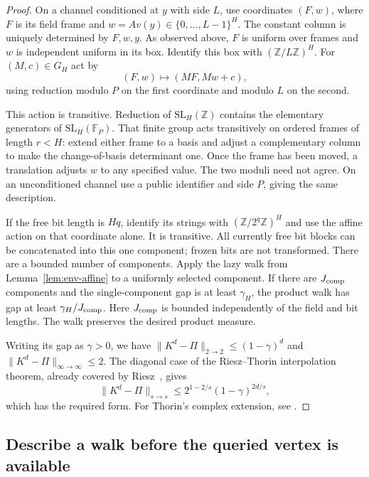 \begin{proof}
On a channel conditioned at $y$ with side $L$, use coordinates
$(F,w)$, where $F$ is its field frame and
$w=Av(y)\in\{0,\ldots,L-1\}^H$. The constant column is uniquely
determined by $F,w,y$. As observed above, $F$ is uniform over frames
and $w$ is independent uniform in its box. Identify this box with
$(\mathbb Z/L\mathbb Z)^H$.
For $(M,c)\in G_H$ act by
\[
(F,w)\longmapsto(MF,Mw+c),
\]
using reduction modulo $P$ on the first coordinate and modulo $L$
on the second.

This action is transitive. Reduction of $\mathrm{SL}_H(\mathbb Z)$
contains the elementary generators of $\mathrm{SL}_H(\mathbb F_P)$.
That finite group acts transitively on ordered frames of length
$r<H$: extend either frame to a basis and adjust a complementary
column to make the change-of-basis determinant one. Once the frame
has been moved, a translation adjusts $w$ to any specified value.
The two moduli need not agree. On an unconditioned channel use a
public identifier and side $P$, giving the same description.

If the free bit length is $Hq$, identify its strings with
$(\mathbb Z/2^q\mathbb Z)^H$ and use the affine action on that
coordinate alone. It is transitive. All currently free bit blocks
can be concatenated into this one component; frozen bits are not
transformed.
There are a bounded number of components. Apply the lazy walk from
Lemma~\ref{lem:env-affine} to a uniformly selected component.
If there are $J_{\rm comp}$ components and the single-component gap is
at least $\gamma_H$, the product walk has gap at least
$\gamma_H/J_{\rm comp}$. Here $J_{\rm comp}$ is bounded independently
of the field and bit lengths. The walk preserves the desired product
measure.

Writing its gap as $\gamma>0$, we have
$\|K^d-\Pi\|_{2\to2}\le(1-\gamma)^d$ and
$\|K^d-\Pi\|_{\infty\to\infty}\le2$.
The diagonal case of the Riesz--Thorin interpolation theorem, already
covered by Riesz~\cite[Theorems~II and~II$'$, p.~472]{Riesz1927}, gives
\[
\|K^d-\Pi\|_{s\to s}
\le 2^{1-2/s}(1-\gamma)^{2d/s},
\]
which has the required form. For Thorin's complex extension, see
\cite[Introduction, \S0.1; Russian translation, pp.~43--45]{Thorin1948}.
\end{proof}

\subsection{Describe a walk before the queried vertex is available}

